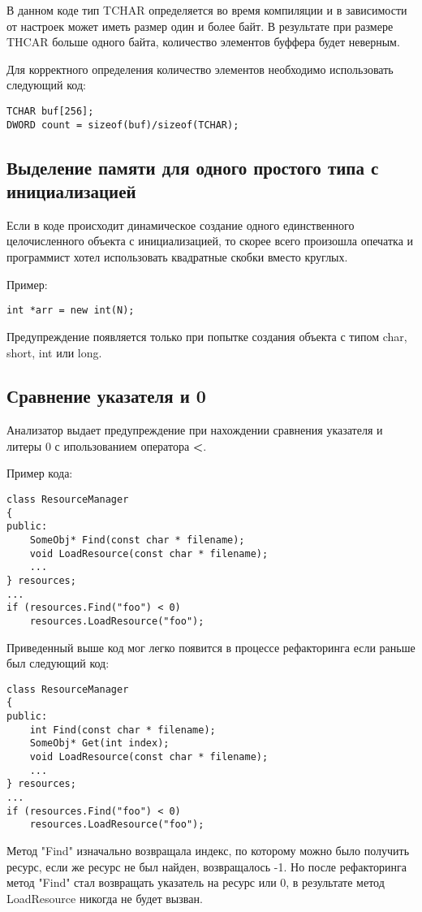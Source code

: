 В данном коде тип TCHAR определяется во время компиляции и в зависимости от настроек
может иметь размер один и более байт. В результате при размере THCAR больше одного байта,
количество элементов буффера будет неверным. 

Для корректного определения количество элементов необходимо использовать следующий код:
\begin{lstlisting}
TCHAR buf[256];
DWORD count = sizeof(buf)/sizeof(TCHAR);
\end{lstlisting}

\subsection{Выделение памяти для одного простого типа с инициализацией}
\label{sec:new}
Если в коде происходит динамическое создание одного единственного целочисленного объекта с
инициализацией, то скорее всего произошла опечатка и программист хотел использовать
квадратные скобки вместо круглых.

Пример:
\begin{lstlisting}
int *arr = new int(N);
\end{lstlisting}

Предупреждение появляется только при попытке создания объекта с типом char, short, int или long.

\subsection{Сравнение указателя и 0}
\label{sec:ptrCmp}
Анализатор выдает предупреждение при нахождении сравнения указателя и литеры 0 с ипользованием 
оператора \textbf{<}.

Пример кода:
\begin{lstlisting}
class ResourceManager
{
public:
	SomeObj* Find(const char * filename);
	void LoadResource(const char * filename);
	...
} resources;
...
if (resources.Find("foo") < 0)
	resources.LoadResource("foo");
\end{lstlisting}
  
Приведенный выше код мог легко появится в процессе рефакторинга если раньше был следующий код: 
\begin{lstlisting}
class ResourceManager
{
public:
	int Find(const char * filename);
	SomeObj* Get(int index);
	void LoadResource(const char * filename);
	...
} resources;
...
if (resources.Find("foo") < 0)
	resources.LoadResource("foo");
\end{lstlisting}
Метод "Find" изначально возвращала индекс, по которому можно было получить ресурс, если же 
ресурс не был найден, возвращалось -1. Но после рефакторинга метод "Find" стал возвращать указатель на 
ресурс или 0, в результате метод LoadResource никогда не будет вызван.

